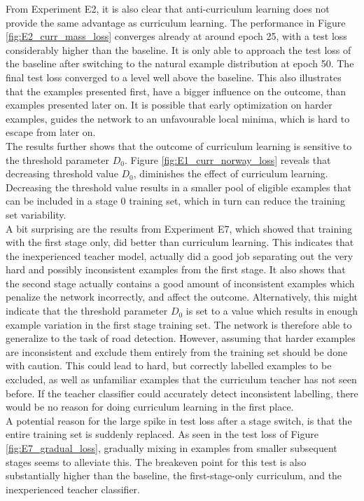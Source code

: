 From Experiment E2, it is also clear that anti-curriculum learning does not provide the same advantage as curriculum learning. The performance in Figure \ref{fig:E2_curr_mass_loss} converges already at around epoch 25, with a test loss considerably higher than the baseline. It is only able to approach the test loss of the baseline after switching to the natural example distribution at epoch 50. The final test loss converged to a level well above the baseline. This also illustrates that the examples presented first, have a bigger influence on the outcome, than examples presented later on. It is possible that early optimization on harder examples, guides the network to an unfavourable local minima, which is hard to escape from later on.\\

The results further shows that the outcome of curriculum learning is sensitive to the threshold parameter $D_0$. Figure \ref{fig:E1_curr_norway_loss} reveals that decreasing threshold value $D_0$, diminishes the effect of curriculum learning. Decreasing the threshold value results in a smaller pool of eligible examples that can be included in a stage 0 training set, which in turn can reduce the training set variability.\\ 

A bit surprising are the results from Experiment E7, which showed that training with the first stage only, did better than curriculum learning. This indicates that the inexperienced teacher model, actually did a good job separating out the very hard and possibly inconsistent examples from the first stage. It also shows that the second stage actually contains a good amount of inconsistent examples which penalize the network incorrectly, and affect the outcome. Alternatively, this might indicate that the threshold parameter $D_0$ is set to a value which results in enough example variation in the first stage training set. The network is therefore able to generalize to the task of road detection. However, assuming that harder examples are inconsistent and exclude them entirely from the training set should be done with caution. This could lead to hard, but correctly labelled examples to be excluded, as well as unfamiliar examples that the curriculum teacher has not seen before. If the teacher classifier could accurately detect inconsistent labelling, there would be no reason for doing curriculum learning in the first place.\\ 

A potential reason for the large spike in test loss after a stage switch, is that the entire training set is suddenly replaced. As seen in the test loss of Figure \ref{fig:E7_gradual_loss}, gradually mixing in examples from smaller subsequent stages seems to alleviate this. The breakeven point for this test is also substantially higher than the baseline, the first-stage-only curriculum, and the inexperienced teacher classifier.\\

